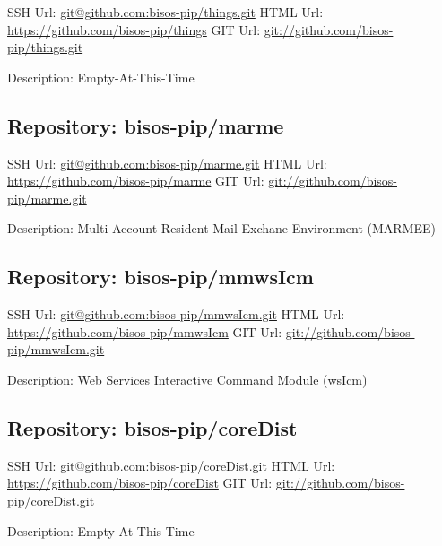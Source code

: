 SSH Url:  \url{git@github.com:bisos-pip/things.git}
HTML Url: \url{https://github.com/bisos-pip/things}
GIT Url:  \url{git://github.com/bisos-pip/things.git}

Description: Empty-At-This-Time

\subsection{Repository: bisos-pip/marme}

SSH Url:  \url{git@github.com:bisos-pip/marme.git}
HTML Url: \url{https://github.com/bisos-pip/marme}
GIT Url:  \url{git://github.com/bisos-pip/marme.git}

Description: Multi-Account Resident Mail Exchane Environment (MARMEE)

\subsection{Repository: bisos-pip/mmwsIcm}

SSH Url:  \url{git@github.com:bisos-pip/mmwsIcm.git}
HTML Url: \url{https://github.com/bisos-pip/mmwsIcm}
GIT Url:  \url{git://github.com/bisos-pip/mmwsIcm.git}

Description: Web Services Interactive Command Module (wsIcm)

\subsection{Repository: bisos-pip/coreDist}

SSH Url:  \url{git@github.com:bisos-pip/coreDist.git}
HTML Url: \url{https://github.com/bisos-pip/coreDist}
GIT Url:  \url{git://github.com/bisos-pip/coreDist.git}

Description: Empty-At-This-Time
